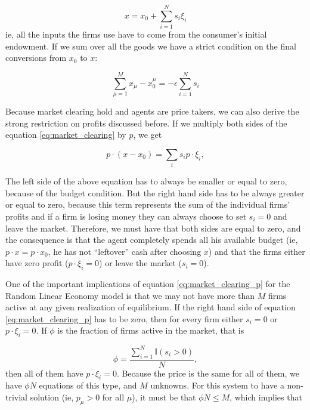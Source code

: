 \begin{equation}
x = x_0 + \sum_{i=1}^N s_i \xi_i
\label{eq:market_clearing}
\end{equation}
ie, all the inputs the firms use have to come from the consumer's
initial endowment. If we sum over all the goods we have a strict condition on the final conversions from $x_0$ to $x$:

\begin{equation}
\label{eq:mc_eff}
  \sum_{\mu = 1}^M x_\mu - x_0^\mu = -\epsilon \sum_{i=1}^N s_i
\end{equation}

Because market clearing hold and agents are price takers, we can also
derive the strong restriction on profits discussed before. If we
multiply both sides of the equation \eqref{eq:market_clearing} by $p$,
we get

\begin{equation}
  \label{eq:market_clearing_p}
  p\cdot (x - x_0) = \sum_i s_i p \cdot \xi_i,
\end{equation}

The left side of the above equation has to always be smaller or equal
to zero, because of the budget condition. But the right hand side has
to be always greater or equal to zero, because this term represents
the sum of the individual firms' profits and if a firm is losing money
they can always choose to set $s_i = 0$ and leave the
market. Therefore, we must have that both sides are equal to zero, and
the consequence is that the agent completely spends all his available
budget (ie, $p\cdot x = p \cdot x_0$, he has not ``leftover'' cash
after choosing $x$) and that the firms either have zero profit
($p\cdot \xi_i = 0$) or leave the market ($s_i = 0$).

One of the important implications of equation
\eqref{eq:market_clearing_p} for the Random Linear Economy model is
that we may not have more than $M$ firms active at any given
realization of equilibrium. If the right hand side of equation
\eqref{eq:market_clearing_p} has to be zero, then for every firm
either $s_i = 0$ or $p\cdot \xi_i = 0$. If $\phi$ is the fraction of
firms active in the market, that is

\begin{equation}
  \label{eq:phi_def}
  \phi = \frac{\sum_{i=1}^N \mathds{I}(s_i > 0)}{N},
\end{equation}
then all of them have $p\cdot \xi_i = 0$. Because the price is the
same for all of them, we have $\phi N$ equations of this type, and $M$
unknowns. For this system to have a non-trivial solution (ie,
$p_\mu > 0$ for all $\mu$), it must be that $\phi N \leq M$, which
implies that

